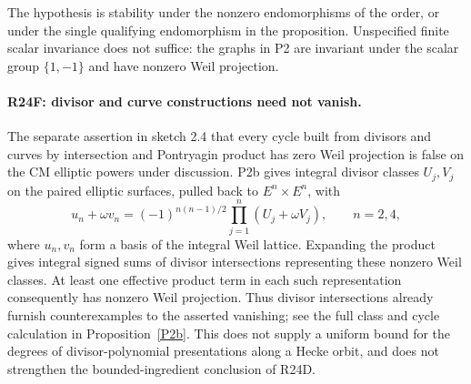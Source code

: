 \documentclass[11pt,a4paper]{article}
\theoremstyle{definition}\newtheorem{definition}[theorem]{Definition}
\theoremstyle{remark}\newtheorem{remark}[theorem]{Remark}
\begin{document}
The hypothesis is stability under the nonzero endomorphisms of the order, or under the single qualifying endomorphism in the proposition. Unspecified finite scalar invariance does not suffice: the graphs in P2 are invariant under the scalar group $\{1,-1\}$ and have nonzero Weil projection.

\paragraph{R24F: divisor and curve constructions need not vanish.}\label{R24F}
The separate assertion in sketch 2.4 that every cycle built from divisors and curves by intersection and Pontryagin product has zero Weil projection is false on the CM elliptic powers under discussion. P2b gives integral divisor classes $U_j,V_j$ on the paired elliptic surfaces, pulled back to $E^n\times E^n$, with
\[
 u_n+\omega v_n
 =(-1)^{n(n-1)/2}\prod_{j=1}^n(U_j+\omega V_j),\qquad n=2,4,
\]
where $u_n,v_n$ form a basis of the integral Weil lattice. Expanding the product gives integral signed sums of divisor intersections representing these nonzero Weil classes. At least one effective product term in each such representation consequently has nonzero Weil projection. Thus divisor intersections already furnish counterexamples to the asserted vanishing; see the full class and cycle calculation in Proposition~\ref{P2b}. This does not supply a uniform bound for the degrees of divisor-polynomial presentations along a Hecke orbit, and does not strengthen the bounded-ingredient conclusion of R24D.
\end{document}
